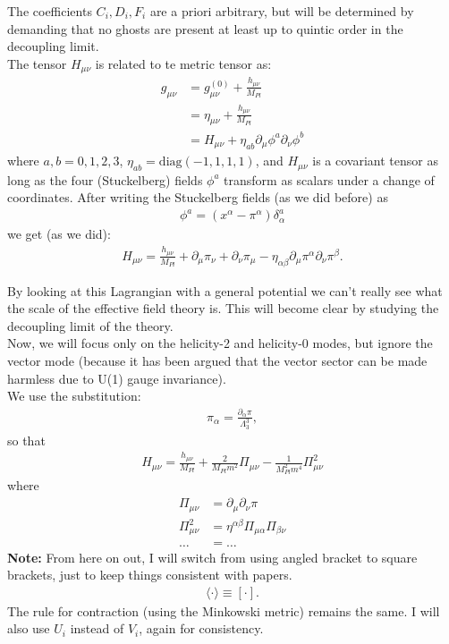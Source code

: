 \documentclass{book}
\theoremstyle{definition}
\newcommand{\p}{\partial}
\newcommand{\nn}{\nonumber}
\newcommand{\al}{\alpha}
\newcommand{\be}{\beta}
\newcommand{\f}[2]{\frac{#1}{#2}}
\begin{document}
The coefficients $C_i,D_i,F_i$ are a priori arbitrary, but will be determined by demanding that no ghosts are present at least up to quintic order in the decoupling limit. \\

The tensor $H_{\mu\nu}$ is related to te metric tensor as:
\begin{align}
g_{\mu\nu} &= g^{(0)}_{\mu\nu} + \f{h_{\mu\nu}}{M_{Pl}}\nn\\
&= \eta_{\mu\nu} + \f{h_{\mu\nu}}{M_{Pl}}\nn\\
&= H_{\mu\nu} + \eta_{ab}\p_\mu \phi^a \p_\nu \phi^b
\end{align}
where $a,b=0,1,2,3$, $\eta_{ab} = \text{diag}(-1,1,1,1)$, and $H_{\mu\nu}$ is a covariant tensor as long as the four (Stuckelberg) fields $\phi^a$ transform as scalars under a change of coordinates. After writing the Stuckelberg fields (as we did before) as
\begin{align}
\phi^a = (x^\al - \pi^\al)\delta^a_\al
\end{align}
we get (as we did):
\begin{align}
H_{\mu\nu} = \f{h_{\mu\nu}}{M_{Pl}} + \p_\mu \pi_\nu + \p_\nu \pi_\mu - \eta_{\al\be}\p_\mu \pi^\al \p_\nu \pi^\be.
\end{align}

By looking at this Lagrangian with a general potential we can't really see what the scale of the effective field theory is. This will become clear by studying the decoupling limit of the theory.\\


Now, we will focus only on the helicity-2 and helicity-0 modes, but ignore the vector mode (because it has been argued that the vector sector can be made harmless due to U(1) gauge invariance). \\

We use the substitution:
\begin{align}
\pi_\al = \f{\p_\al \pi}{\Lambda_3^3},
\end{align}
so that
\begin{align}
H_{\mu\nu} = \f{h_{\mu\nu}}{M_{Pl}} + \f{2}{M_{Pl}m^2}\Pi_{\mu\nu} - \f{1}{M^2_{Pl} m^4} \Pi^2_{\mu\nu}
\end{align}
where 
\begin{align}
\Pi_{\mu\nu} &= \p_\mu \p_\nu \pi\\
\Pi^2_{\mu\nu}&= \eta^{\al\be}\Pi_{\mu\al}\Pi_{\be\nu}\\
\dots &= \dots\nn
\end{align}
\textbf{Note:} From here on out, I will switch from using angled bracket to square brackets, just to keep things consistent with papers. 
\begin{align}
\langle \cdot \rangle \equiv [\cdot].
\end{align}
The rule for contraction (using the Minkowski metric) remains the same. I will also use $U_i$ instead of $V_i$, again for consistency.
\end{document}
